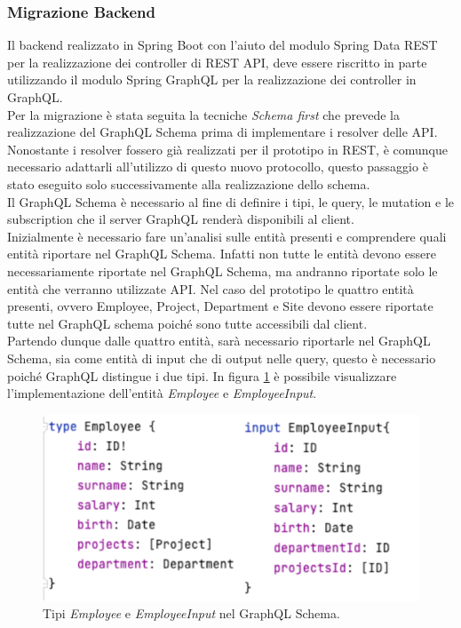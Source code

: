 \subsubsection*{Migrazione Backend}
Il backend realizzato in Spring Boot con l'aiuto del modulo Spring Data REST per la realizzazione dei controller di REST API, deve essere riscritto in parte utilizzando il modulo Spring GraphQL per la realizzazione dei controller in GraphQL.\\
Per la migrazione è stata seguita la tecniche \textit{Schema first} che prevede la realizzazione del GraphQL Schema prima di implementare i resolver delle API. Nonostante i resolver fossero già realizzati per il prototipo in REST, è comunque necessario adattarli all'utilizzo di questo nuovo protocollo, questo passaggio è stato eseguito solo successivamente alla realizzazione dello schema.\\
Il GraphQL Schema è necessario al fine di definire i tipi, le query, le mutation e le subscription che il server GraphQL renderà disponibili al client.\\
Inizialmente è necessario fare un'analisi sulle entità presenti e comprendere quali entità riportare nel GraphQL Schema. Infatti non tutte le entità devono essere necessariamente riportate nel GraphQL Schema, ma andranno riportate solo le entità che verranno utilizzate API. Nel caso del prototipo le quattro entità presenti, ovvero Employee, Project, Department e Site devono essere riportate tutte nel GraphQL schema poiché sono tutte accessibili dal client.\\
Partendo dunque dalle quattro entità, sarà necessario riportarle nel GraphQL Schema, sia come entità di input che di output nelle query, questo è necessario poiché GraphQL distingue i due tipi. In figura \ref{employee-schema} è possibile visualizzare l'implementazione dell'entità \textit{Employee} e \textit{EmployeeInput}.
\FloatBarrier
\begin{figure}[!ht]
\centering
\includegraphics[width=0.8\linewidth]{immagini/employeeSchema.pdf}
\caption{Tipi \textit{Employee} e \textit{EmployeeInput} nel GraphQL Schema.}
\label{employee-schema}
\end{figure}
